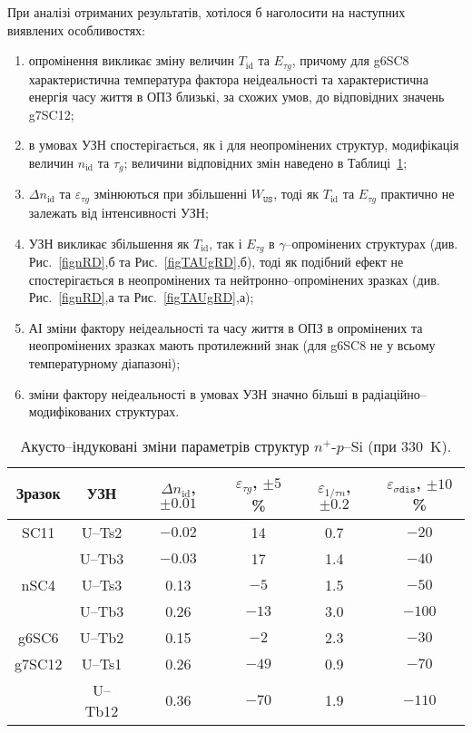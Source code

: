 При аналізі отриманих результатів, хотілося б наголосити на наступних виявлених особливостях:
\begin{enumerate}[label=\asbuk*),leftmargin=0em,itemindent=1.5em]
\item опромінення викликає зміну величин  $T_{\mathrm{id}}$ та $E_{\tau g}$, причому
 для  g6SC8 характеристична температура фактора неідеальності та характеристична енергія часу життя в ОПЗ
 близькі, за схожих умов, до відповідних значень  g7SC12;

\item в умовах УЗН спостерігається, як і для неопромінених структур, модифікація величин $n_{\mathrm{id}}$ та $\tau_g$;
  величини відповідних змін наведено в Таблиці~\ref{tabAIchangeRD};

\item $\Delta n_{\mathrm{id}}$ та $\varepsilon_{\tau g}$ змінюються при збільшенні $W_{\mathtt{US}}$,
 тоді як $T_{\mathrm{id}}$ та $E_{\tau g}$ практично не залежать від інтенсивності УЗН;

\item УЗН викликає збільшення як  $T_{\mathrm{id}}$, так і $E_{\tau g}$ в $\gamma$--опромінених структурах
(див. Рис.~\ref{fignRD},б та Рис.~\ref{figTAUgRD},б),
тоді як подібний ефект не спостерігається в неопромінених та нейтронно--опромінених зразках
(див. Рис.~\ref{fignRD},а та Рис.~\ref{figTAUgRD},а);

\item АІ зміни фактору неідеальності та часу життя в ОПЗ в опромінених та неопромінених зразках мають протилежний знак
 (для g6SC8 не у всьому температурному діапазоні);

\item зміни фактору неідеальності в умовах УЗН значно більші в радіаційно--модифікованих структурах.
\end{enumerate}


\begin{table}
\caption{\label{tabAIchangeRD}Акусто--індуковані зміни параметрів структур $n^+$-$p$--Si (при 330~K).
}
\center
\begin{tabular}{|c|c|c|c|c|c|} \hline
Зразок&УЗН&$\Delta n_{\mathrm{id}}$, $\pm0.01$&$\varepsilon_{\tau g}$, $\pm5$\%&$\varepsilon_{1/\tau n}$, $\pm0.2$&$\varepsilon_{\sigma\mathtt{dis}}$, $\pm10$\%\\
\hline
SC11&U--Ts2&$-0.02$&14&0.7&$-20$\\
&U--Tb3&$-0.03$&17&1.4&$-40$\\ \hline
nSC4&U--Ts3&0.13&$-5$&1.5&$-50$\\
&U--Tb3&0.26&$-13$&3.0&$-100$\\ \hline
g6SC6&U--Tb2&0.15&$-2$&2.3&$-30$\\ \hline
g7SC12&U--Ts1&0.26&$-49$&0.9&$-70$\\
&U--Tb12&0.36&$-70$&1.9&$-110$\\ \hline
\end{tabular}
\end{table}

